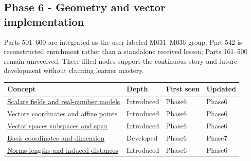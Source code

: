 \subsection{Phase 6 - Geometry and vector implementation}\label{appendix-a6d556a4ef50-phase-6---geometry-and-vector-implementation}

\hypertarget{appendix-a6d556a4ef50-phase-6---geometry-and-vector-implementation}{}

Parts 501--600 are integrated as the user-labeled M031--M036 group. Part 542 is reconstructed enrichment rather than a standalone received lesson; Parts 161--500 remain unreceived. These filled nodes support the continuous story and future development without claiming learner mastery.

{\def\LTcaptype{none} %
\begin{longtable}[]{@{}
  >{\raggedright\arraybackslash}p{}
  >{\raggedright\arraybackslash}p{}
  >{\raggedright\arraybackslash}p{}
  >{\raggedright\arraybackslash}p{}@{}}
\toprule\noalign{}
\begin{minipage}[b]{\linewidth}\raggedright
Concept
\end{minipage} & \begin{minipage}[b]{\linewidth}\raggedright
Depth
\end{minipage} & \begin{minipage}[b]{\linewidth}\raggedright
First seen
\end{minipage} & \begin{minipage}[b]{\linewidth}\raggedright
Updated
\end{minipage} \\
\midrule\noalign{}
\endhead
\bottomrule\noalign{}
\endlastfoot
\hyperref[appendix-52051ad550fe]{Scalars fields and real-number models} & Introduced & Phase6 & Phase6 \\
\hyperref[appendix-0659864c0aa3]{Vectors coordinates and affine points} & Introduced & Phase6 & Phase6 \\
\hyperref[appendix-173b52c063ae]{Vector spaces subspaces and span} & Introduced & Phase6 & Phase6 \\
\hyperref[appendix-ce0341f7ea0d]{Basis coordinates and dimension} & Developed & Phase6 & Phase7 \\
\hyperref[appendix-49933872bb51]{Norms lengths and induced distances} & Introduced & Phase6 & Phase6 \\

\end{longtable}}
